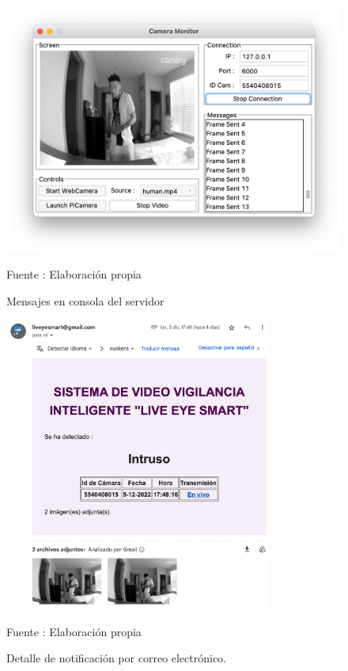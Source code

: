 \begin{figure}[H]
    \begin{center}
        \includegraphics[width=12cm]{img/capitulo_6/human.png}
    \end{center}
    \begin{center}
        \caption{Mensajes en consola del servidor}
        Fuente : Elaboración propia
    \end{center}
\end{figure}

\begin{figure}[H]
    \begin{center}
        \includegraphics[width=8.8cm]{img/capitulo_6/mail_human.png}
    \end{center}
    \begin{center}
        \caption{Detalle de notificación por correo electrónico.}
        Fuente : Elaboración propia
    \end{center}
\end{figure}


